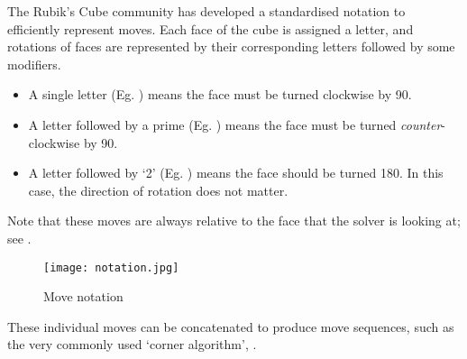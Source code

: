 The Rubik's Cube community has developed a standardised notation to efficiently represent moves.
Each face of the cube is assigned a letter, and rotations of faces are represented by their corresponding letters followed by some modifiers.
\begin{itemize}
	\item A single letter (Eg. ) means the face must be turned clockwise by 90\degree .
	\item A letter followed by a prime (Eg. ) means the face must be turned \emph{counter}-clockwise by 90\degree .
	\item A letter followed by `2' (Eg. ) means the face should be turned 180\degree . In this case, the direction of rotation does not matter.
\end{itemize}
Note that these moves are always relative to the face that the solver is looking at; see .
\begin{figure}[h]
	\centering
	\texttt{[image: notation.jpg]}
	\caption{Move notation}\label{fig:notation}
\end{figure}
These individual moves can be concatenated to produce move sequences, such as the very commonly used `corner algorithm', .